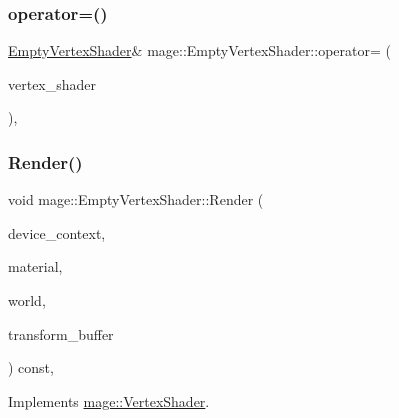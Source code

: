 \subsubsection{\texorpdfstring{operator=()}{operator=()}}
{\footnotesize\ttfamily \hyperlink{classmage_1_1_empty_vertex_shader}{Empty\+Vertex\+Shader}\& mage\+::\+Empty\+Vertex\+Shader\+::operator= (\begin{DoxyParamCaption}\item[{const \hyperlink{classmage_1_1_empty_vertex_shader}{Empty\+Vertex\+Shader} \&}]{vertex\+\_\+shader }\end{DoxyParamCaption})\hspace{0.3cm}{\ttfamily [private]}, {\ttfamily [delete]}}

\hypertarget{classmage_1_1_empty_vertex_shader_ac8fa22999046d1f87b222c6fa5d65612}{}\label{classmage_1_1_empty_vertex_shader_ac8fa22999046d1f87b222c6fa5d65612} 
\subsubsection{\texorpdfstring{Render()}{Render()}}
{\footnotesize\ttfamily void mage\+::\+Empty\+Vertex\+Shader\+::\+Render (\begin{DoxyParamCaption}\item[{\hyperlink{namespacemage_ae74f374780900893caa5555d1031fd79}{Com\+Ptr}$<$ I\+D3\+D11\+Device\+Context2 $>$}]{device\+\_\+context,  }\item[{const \hyperlink{structmage_1_1_material}{Material} \&}]{material,  }\item[{const \hyperlink{classmage_1_1_world}{World} \&}]{world,  }\item[{const \hyperlink{structmage_1_1_transform_buffer}{Transform\+Buffer} \&}]{transform\+\_\+buffer }\end{DoxyParamCaption}) const\hspace{0.3cm}{\ttfamily [override]}, {\ttfamily [virtual]}}



Implements \hyperlink{classmage_1_1_vertex_shader_acc01e7bdd392d1985bbaaed7cbf40461}{mage\+::\+Vertex\+Shader}.

